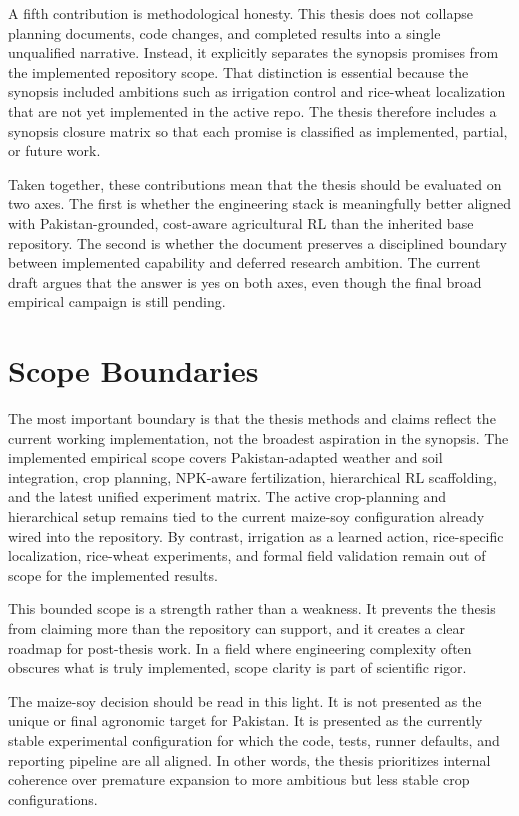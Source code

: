 A fifth contribution is methodological honesty. This thesis does not collapse planning documents, code changes, and completed results into a single unqualified narrative. Instead, it explicitly separates the synopsis promises from the implemented repository scope. That distinction is essential because the synopsis included ambitions such as irrigation control and rice-wheat localization that are not yet implemented in the active repo. The thesis therefore includes a synopsis closure matrix so that each promise is classified as implemented, partial, or future work.

Taken together, these contributions mean that the thesis should be evaluated on two axes. The first is whether the engineering stack is meaningfully better aligned with Pakistan-grounded, cost-aware agricultural RL than the inherited base repository. The second is whether the document preserves a disciplined boundary between implemented capability and deferred research ambition. The current draft argues that the answer is yes on both axes, even though the final broad empirical campaign is still pending.



\section{Scope Boundaries}

The most important boundary is that the thesis methods and claims reflect the current working implementation, not the broadest aspiration in the synopsis. The implemented empirical scope covers Pakistan-adapted weather and soil integration, crop planning, NPK-aware fertilization, hierarchical RL scaffolding, and the latest unified experiment matrix. The active crop-planning and hierarchical setup remains tied to the current maize-soy configuration already wired into the repository. By contrast, irrigation as a learned action, rice-specific localization, rice-wheat experiments, and formal field validation remain out of scope for the implemented results.

This bounded scope is a strength rather than a weakness. It prevents the thesis from claiming more than the repository can support, and it creates a clear roadmap for post-thesis work. In a field where engineering complexity often obscures what is truly implemented, scope clarity is part of scientific rigor.

The maize-soy decision should be read in this light. It is not presented as the unique or final agronomic target for Pakistan. It is presented as the currently stable experimental configuration for which the code, tests, runner defaults, and reporting pipeline are all aligned. In other words, the thesis prioritizes internal coherence over premature expansion to more ambitious but less stable crop configurations.

